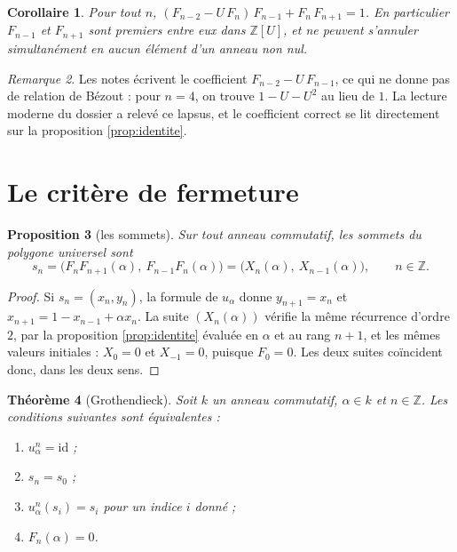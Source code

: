 \documentclass[11pt,a4paper]{article}
\theoremstyle{plain}
\newtheorem{theoreme}{Théorème}[section]
\newtheorem{proposition}[theoreme]{Proposition}
\newtheorem{corollaire}[theoreme]{Corollaire}
\theoremstyle{definition}
\theoremstyle{remark}
\newtheorem{remarque}[theoreme]{Remarque}
\newcommand{\Z}{\mathbb{Z}}
\begin{document}
\begin{corollaire}\label{cor:bezout}
Pour tout $n$, $(F_{n-2}-U\,F_n)\,F_{n-1}+F_n\,F_{n+1}=1$. En particulier $F_{n-1}$ et $F_{n+1}$ sont premiers entre eux dans $\Z[U]$, et ne peuvent s'annuler simultanément en aucun élément d'un anneau non nul.
\end{corollaire}

\begin{remarque}
Les notes écrivent le coefficient $F_{n-2}-U\,F_{n-1}$, ce qui ne donne pas de relation de Bézout : pour $n=4$, on trouve $1-U-U^2$ au lieu de $1$. La lecture moderne du dossier a relevé ce lapsus, et le coefficient correct se lit directement sur la proposition \ref{prop:identite}.
\end{remarque}

\section{Le critère de fermeture}

\begin{proposition}[les sommets]\label{prop:sommets}
Sur tout anneau commutatif, les sommets du polygone universel sont
\[
  s_n=\big(F_nF_{n+1}(\alpha),\ F_{n-1}F_n(\alpha)\big)=\big(X_n(\alpha),\ X_{n-1}(\alpha)\big),\qquad n\in\Z .
\]
\end{proposition}

\begin{proof}
Si $s_n=(x_n,y_n)$, la formule de $u_\alpha$ donne $y_{n+1}=x_n$ et $x_{n+1}=1-x_{n-1}+\alpha x_n$. La suite $(X_n(\alpha))$ vérifie la même récurrence d'ordre $2$, par la proposition \ref{prop:identite} évaluée en $\alpha$ et au rang $n+1$, et les mêmes valeurs initiales : $X_0=0$ et $X_{-1}=0$, puisque $F_0=0$. Les deux suites coïncident donc, dans les deux sens.
\end{proof}

\begin{theoreme}[Grothendieck]\label{thm:fermeture}
Soit $k$ un anneau commutatif, $\alpha\in k$ et $n\in\Z$. Les conditions suivantes sont équivalentes :
\begin{enumerate}[label=\alph*),nosep]
\item $u_\alpha^n=\mathrm{id}$ ;
\item $s_n=s_0$ ;
\item $u_\alpha^n(s_i)=s_i$ pour un indice $i$ donné ;
\item $F_n(\alpha)=0$.
\end{enumerate}
\end{theoreme}
\end{document}
